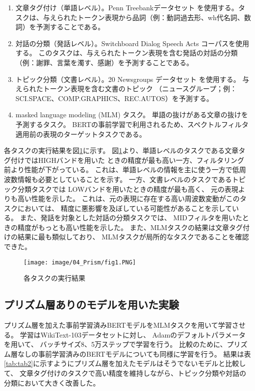 \documentclass{jsarticle}
\begin{document}
\begin{enumerate}
  \item 文章タグ付け（単語レベル）。Penn Treebankデータセット
  を使用する。タスクは、与えられたトークン表現から品詞（例：動詞過去形、wh代名詞、数詞）を予測することである。
  \item 対話の分類（発話レベル）。Switchboard Dialog Speech Acts コーパスを使用する。
  このタスクは、与えられたトークン表現を含む発話の対話の分類
  （例：謝罪、言葉を濁す、感謝）を予測することである。
  \item トピック分類（文書レベル）。20 Newsgroups データセット を使用する。
  与えられたトークン表現を含む文書のトピック
  （ニュースグループ；例：SCI.SPACE、COMP.GRAPHICS、REC.AUTOS）を予測する。
  \item masked language modeling (MLM) タスク。
  単語の抜けがある文章の抜けを予測するタスク。
  BERTの事前学習で利用されるため、スペクトルフィルタ適用前の表現のターゲットタスクである。
\end{enumerate}

各タスクの実行結果を図\ref{fig:fig1}に示す。
図\ref{fig:fig1}より、単語レベルのタスクである文章タグ付けではHIGHバンドを用いた
ときの精度が最も高い一方、フィルタリング前より性能が下がっている。
これは、単語レベルの情報を主に使う一方で低周波数情報も必要としていることを示す。
一方、文書レベルのタスクであるトピック分類タスクでは
LOWバンドを用いたときの精度が最も高く、
元の表現よりも高い性能を示した。
これは、元の表現に存在する高い周波数変動がこのタスクにおいては、
精度に悪影響を及ぼしている可能性があることを示している。
また、発話を対象とした対話の分類タスクでは、
MIDフィルタを用いたときの精度がもっとも高い性能を示した。
また、MLMタスクの結果は文章タグ付けの結果に最も類似しており、
MLMタスクが局所的なタスクであることを確認できた。

\begin{figure}[H]
  \begin{center}
    \texttt{[image: image/04\_Prism/fig1.PNG]}
    \caption{各タスクの実行結果}
    \label{fig:fig1}
  \end{center}
\end{figure}

\subsection{プリズム層ありのモデルを用いた実験}
プリズム層を加えた事前学習済みBERTモデルをMLMタスクを用いて学習させる。
学習はWikiText-103データセットに対し、
Adamのデフォルトパラメータを用いて、
バッチサイズ8、5万ステップで学習を行う。
比較のために、プリズム層なしの事前学習済みのBERTモデルについても同様に学習を行う。
結果は表\ref{tab:tab2}に示すようにプリズム層を加えたモデルはそうでないモデルと比較して、
文章タグ付けのタスクで高い精度を維持しながら、トピック分類や対話の分類において大きく改善した。
\end{document}
